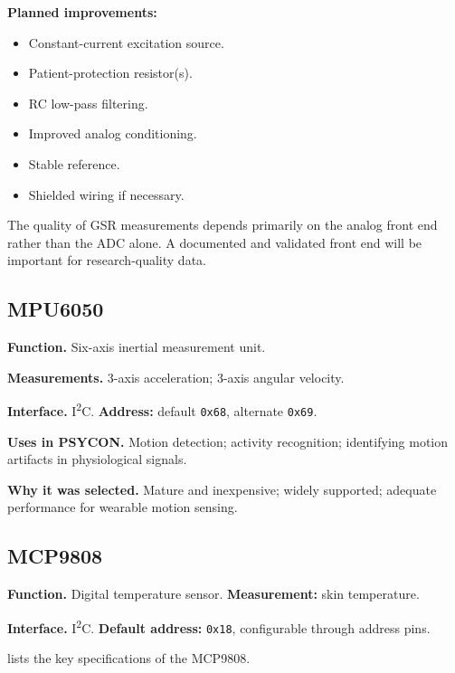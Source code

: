 \begin{futureworkbox}
\textbf{Planned improvements:}
\begin{itemize}
    \item Constant-current excitation source.
    \item Patient-protection resistor(s).
    \item RC low-pass filtering.
    \item Improved analog conditioning.
    \item Stable reference.
    \item Shielded wiring if necessary.
\end{itemize}
\end{futureworkbox}

\begin{engnote}
The quality of GSR measurements depends primarily on the analog front end rather than the ADC alone. A documented and validated front end will be important for research-quality data.
\end{engnote}

\subsection{MPU6050}
\label{sec:mpu6050}

\textbf{Function.} Six-axis inertial measurement unit.

\textbf{Measurements.} 3-axis acceleration; 3-axis angular velocity.

\textbf{Interface.} I\textsuperscript{2}C. \textbf{Address:} default \texttt{0x68}, alternate \texttt{0x69}.

\textbf{Uses in PSYCON.} Motion detection; activity recognition; identifying motion artifacts in physiological signals.

\textbf{Why it was selected.} Mature and inexpensive; widely supported; adequate performance for wearable motion sensing.

\subsection{MCP9808}
\label{sec:mcp9808}

\textbf{Function.} Digital temperature sensor. \textbf{Measurement:} skin temperature.

\textbf{Interface.} I\textsuperscript{2}C. \textbf{Default address:} \texttt{0x18}, configurable through address pins.

 lists the key specifications of the MCP9808.

